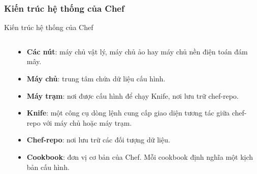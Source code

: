 \documentclass[14pt]{beamer}
\begin{document}
\subsubsection*{Kiến trúc hệ thống của Chef}
\begin{frame}{Kiến trúc hệ thống của Chef}
\setlength{\topsep}{0pt}
\begin{columns}
\begin{column}{0.75\textwidth}
    \begin{center}
    \end{center}
\end{column}
\hfill
\begin{column}{0.38\textwidth}
\begin{scriptsize}
  \begin{itemize}
    \item \textbf{Các nút}: máy chủ vật lý, máy chủ ảo hay máy chủ nền điện toán đám mây.
    \item \textbf{Máy chủ}: trung tâm chứa dữ liệu cấu hình.
    \item \textbf{Máy trạm}: nơi được cấu hình để chạy Knife, nơi lưu trữ chef-repo.
    \item \textbf{Knife}: một công cụ dòng lệnh cung cấp giao diện tương tác giữa chef-repo với máy chủ hoặc máy trạm.
    \item \textbf{Chef-repo}: nơi lưu trữ các đối tượng dữ liệu.
    \item \textbf{Cookbook}: đơn vị cơ bản của Chef. Mỗi cookbook định nghĩa một kịch bản cấu hình.
  \end{itemize}
\end{scriptsize}
\end{column}
\end{columns}
\end{frame}
\end{document}

